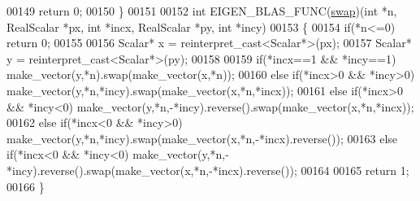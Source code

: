 \begin{DoxyCode}
00149   \textcolor{keywordflow}{return} 0;
00150 \}
00151 
00152 \textcolor{keywordtype}{int} EIGEN\_BLAS\_FUNC(\hyperlink{endian_8c_a3ca5ecd34b04d6a243c054ac3a57f68d}{swap})(\textcolor{keywordtype}{int} *n, RealScalar *px, \textcolor{keywordtype}{int} *incx, RealScalar *py, \textcolor{keywordtype}{int} *incy)
00153 \{
00154   \textcolor{keywordflow}{if}(*n<=0) \textcolor{keywordflow}{return} 0;
00155 
00156   Scalar* x = \textcolor{keyword}{reinterpret\_cast<}Scalar*\textcolor{keyword}{>}(px);
00157   Scalar* y = \textcolor{keyword}{reinterpret\_cast<}Scalar*\textcolor{keyword}{>}(py);
00158 
00159   \textcolor{keywordflow}{if}(*incx==1 && *incy==1)    make\_vector(y,*n).swap(make\_vector(x,*n));
00160   \textcolor{keywordflow}{else} \textcolor{keywordflow}{if}(*incx>0 && *incy>0) make\_vector(y,*n,*incy).swap(make\_vector(x,*n,*incx));
00161   \textcolor{keywordflow}{else} \textcolor{keywordflow}{if}(*incx>0 && *incy<0) make\_vector(y,*n,-*incy).reverse().swap(make\_vector(x,*n,*incx));
00162   \textcolor{keywordflow}{else} \textcolor{keywordflow}{if}(*incx<0 && *incy>0) make\_vector(y,*n,*incy).swap(make\_vector(x,*n,-*incx).reverse());
00163   \textcolor{keywordflow}{else} \textcolor{keywordflow}{if}(*incx<0 && *incy<0) make\_vector(y,*n,-*incy).reverse().swap(make\_vector(x,*n,-*incx).reverse());
00164 
00165   \textcolor{keywordflow}{return} 1;
00166 \}
\end{DoxyCode}
